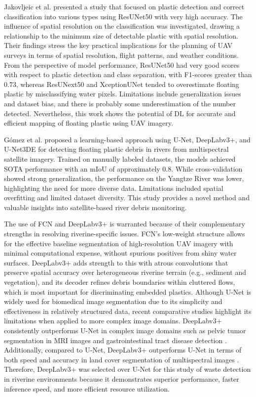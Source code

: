 \documentclass{ieeeaccess}
\begin{document}
Jakovljeic et al. \cite{Jakovljevic2020ADL} presented a study that focused on plastic detection and correct classification into various types using ResUNet50 with very high accuracy. The influence of spatial resolution on the classification was investigated, drawing a relationship to the minimum size of detectable plastic with spatial resolution. Their findings stress the key practical implications for the planning of UAV surveys in terms of spatial resolution, flight patterns, and weather conditions. From the perspective of model performance, ResUNet50 had very good scores with respect to plastic detection and class separation, with F1-scores greater than 0.73, whereas ResUNext50 and XceptionUNet tended to overestimate floating plastic by misclassifying water pixels. Limitations include generalization issues and dataset bias, and there is probably some underestimation of the number detected. Nevertheless, this work shows the potential of DL for accurate and efficient mapping of floating plastic using UAV imagery.

Gómez et al. \cite{Gmez2022ALA} proposed a learning-based approach using U-Net, DeepLabv3+, and U-Net3DE for detecting floating plastic debris in rivers from multispectral satellite imagery. Trained on manually labeled datasets, the models achieved SOTA performance with an mIoU of approximately 0.8. While cross-validation showed strong generalization, the performance on the Yangtze River was lower, highlighting the need for more diverse data. Limitations included spatial overfitting and limited dataset diversity. This study provides a novel method and valuable insights into satellite-based river debris monitoring.

The use of FCN and DeepLabv3+ is warranted because of their complementary strengths in resolving riverine-specific issues. FCN's low-weight structure allows for the effective baseline segmentation of high-resolution UAV imagery with minimal computational expense, without spurious positives from shiny water surfaces. DeepLabv3+ adds strength to this with atrous convolutions that preserve spatial accuracy over heterogeneous riverine terrain (e.g., sediment and vegetation), and its decoder refines debris boundaries within cluttered flows, which is most important for discriminating embedded plastics. Although U-Net is widely used for biomedical image segmentation due to its simplicity and effectiveness in relatively structured data, recent comparative studies highlight its limitations when applied to more complex image domains. DeepLabv3+ consistently outperforms U-Net in complex image domains such as pelvic tumor segmentation in MRI images \cite{nobnop2024pelvic} and gastrointestinal tract disease detection \cite{aadarsh2023comparing}. Additionally, compared to U-Net, DeepLabv3+ outperforms U-Net in terms of both speed and accuracy in land cover segmentation of multispectral images \cite{handayanto2024land}. Therefore, DeepLabv3+ was selected over U-Net for this study of waste detection in riverine environments because it demonstrates superior performance, faster inference speed, and more efficient resource utilization.
\end{document}

